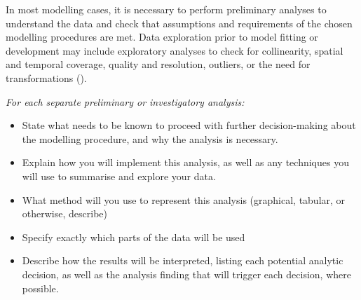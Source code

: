 \documentclass[
]{article}
\providecommand{\tightlist}{%
  \setlength{\itemsep}{0pt}\setlength{\parskip}{0pt}}
\begin{document}
\begin{tcolorbox}[enhanced jigsaw, opacitybacktitle=0.6, bottomrule=.15mm, leftrule=.75mm, rightrule=.15mm, colbacktitle=quarto-callout-note-color!10!white, toprule=.15mm, titlerule=0mm, left=2mm, colframe=quarto-callout-note-color-frame, breakable, title=\textcolor{quarto-callout-note-color}{\faInfo}\hspace{0.5em}{Explanation}, opacityback=0, coltitle=black, bottomtitle=1mm, colback=white, toptitle=1mm, arc=.35mm]

In most modelling cases, it is necessary to perform preliminary analyses
to understand the data and check that assumptions and requirements of
the chosen modelling procedures are met. Data exploration prior to model
fitting or development may include exploratory analyses to check for
collinearity, spatial and temporal coverage, quality and resolution,
outliers, or the need for transformations
().

\end{tcolorbox}

\begin{tcolorbox}[enhanced jigsaw, opacitybacktitle=0.6, bottomrule=.15mm, leftrule=.75mm, rightrule=.15mm, colbacktitle=quarto-callout-caution-color!10!white, toprule=.15mm, titlerule=0mm, left=2mm, colframe=quarto-callout-caution-color-frame, breakable, title=\textcolor{quarto-callout-caution-color}{\faFire}\hspace{0.5em}{Preregistration Item}, opacityback=0, coltitle=black, bottomtitle=1mm, colback=white, toptitle=1mm, arc=.35mm]

\emph{For each separate preliminary or investigatory analysis:}

\begin{itemize}
\tightlist
\item[$\square$]
  State what needs to be known to proceed with further decision-making
  about the modelling procedure, and why the analysis is necessary.
\item[$\square$]
  Explain how you will implement this analysis, as well as any
  techniques you will use to summarise and explore your data.
\item[$\square$]
  What method will you use to represent this analysis (graphical,
  tabular, or otherwise, describe)
\item[$\square$]
  Specify exactly which parts of the data will be used
\item[$\square$]
  Describe how the results will be interpreted, listing each potential
  analytic decision, as well as the analysis finding that will trigger
  each decision, where possible.
\end{itemize}

\end{tcolorbox}
\end{document}
